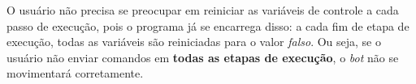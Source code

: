 O usuário não precisa se preocupar em reiniciar as variáveis de controle a cada
passo de execução, pois o programa já se encarrega disso: a cada fim de etapa de
execução, todas as variáveis são reiniciadas para o valor \textit{falso}. Ou
seja, se o usuário não enviar comandos em \textbf{todas as etapas de execução},
o \textit{bot} não se movimentará corretamente.
